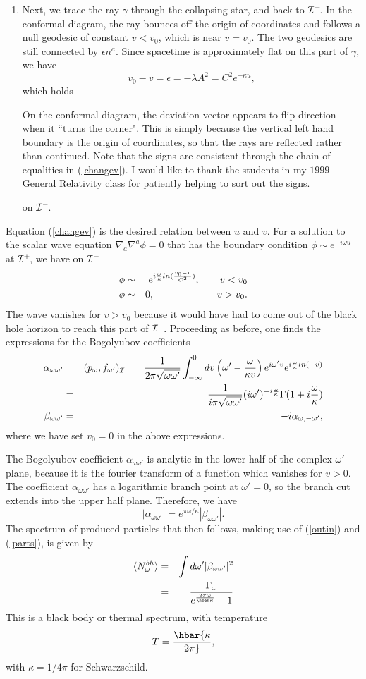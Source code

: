 \documentclass[12pt]{article}
\newcommand{\be}{\begin{equation}}
\newcommand{\ee}{\end{equation}}
\newcommand{\p}{\partial}
\def\bena{\begin{eqnarray}}
\def\eena{\end{eqnarray}}
\def\finf{{\cal I}^+}
\def\pinf{{\cal I}^-}
\def\p{p_{\omega}}
\def\alp{\alpha _{\omega \omega '}}
\def\bet{\beta_{\omega\omega '}}
\begin{document}
\begin{enumerate}
\item Next, we trace the ray $\gamma$ through the collapsing star, and back
to $\pinf\!$. In the conformal diagram, the ray bounces off the origin
of coordinates and follows a null geodesic of constant $v <v_0$, which is
near $v=v_0$. The two geodesics are still connected by $\epsilon n^a$. Since
spacetime is approximately flat on this part of $\gamma$, we
have
%
\be\label{changev}v_0 -v =\epsilon =-\lambda A^2 =C^2 e^{-\kappa u} ,\ee
%
which holds\begin{footnote}{On the conformal diagram, the deviation vector
appears to flip direction when it ``turns the corner".  This is simply  because
the vertical left hand boundary is the origin of coordinates, so that the
rays are
reflected rather than continued.  Note that the signs are consistent
through the chain of equalities in (\ref{changev}).  I would like to thank the
students in my $1999$ General Relativity class for patiently helping to sort out
the signs.}\end{footnote}
on $\pinf\!$.
\end{enumerate}

Equation (\ref{changev}) is the desired relation between $u$ and $v$.
For a solution to the scalar wave equation $\nabla _a \nabla ^a \phi =0$ that
has the boundary condition $\phi\sim e^{-i\omega u}$ at $\finf\!$, we have
on $\pinf$
%
\bena\label{inwave}
\phi &\sim &
e^{i{\omega \over\kappa}ln ({v_0 -v \over C^2})},\qquad    v<v_0 \\
\phi &\sim & 0,\qquad\qquad\qquad\   v>v_0 .
\eena
%
The wave vanishes for $v>v_0$ because it would have had to come out
of the black hole horizon to reach this part of $\pinf\!$.  Proceeding as
before, one finds
the expressions for the Bogolyubov coefficients
%
\bena\label{bhalp}\alp &=& (\p ,f_{\omega '} )_{\pinf} = {1\over
2\pi\sqrt{\omega\omega^\prime}}
\int_{-\infty}^0 dv \left(\omega ' -{\omega \over \kappa v }\right)
e^{i\omega ' v}
e ^{i {\omega \over \kappa} ln( -v  )}  \\
&= &{1\over i\pi \sqrt{\omega \omega '}}
(i\omega ' )^{-i {\omega \over \kappa}}\Gamma (1 +i {\omega \over \kappa} ) \\
\bet &=&-i\alpha _{\omega ,-\omega '},\eena
%
where we have set $v_0=0$ in the above expressions.

The Bogolyubov coefficient
$\alp$ is analytic in the lower half of the complex $\omega '$ plane, because
it is the fourier transform of a function which vanishes for $v>0$.  The
coefficient
$\alp$ has a logarithmic branch point at $\omega '= 0$, so the branch cut
extends into the upper half plane. Therefore, we have
%
\be\label{abratio}|\alp |=e^{\pi\omega /\kappa} |\bet |.\ee
%
The spectrum of produced particles that then follows, making use of
(\ref{outin}) and
(\ref{parts}),
is given by
%
\bena\label{bhspec} \langle N_{\omega }^{bh} \rangle & =&\int d\omega ' |\bet |^2 \\
 &=&{\Gamma_{\omega} \over e^{ {2\pi \omega \over
\hbar \kappa} } -1 }\eena
%
This is a black body or thermal spectrum, with temperature
%
\be\label{bhtemp}T=\hbar {\kappa\over 2\pi},\ee
%
with $\kappa =1/ 4\pi$  for Schwarzschild.
\end{document}
